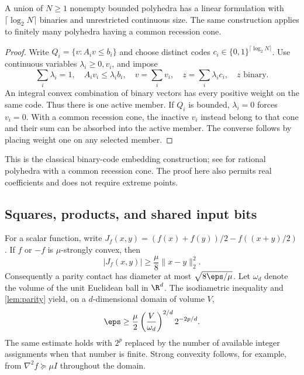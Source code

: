 \begin{lemma}\label{lem:disjunction}
A union of $N\ge1$ nonempty bounded polyhedra has a linear formulation
with $\lceil\log_2N\rceil$ binaries and unrestricted continuous size.
The same construction applies to finitely many polyhedra having a common
recession cone.
\end{lemma}
\begin{proof}
Write $Q_i=\{v:A_iv\le b_i\}$ and choose distinct codes
$c_i\in\{0,1\}^{\lceil\log_2N\rceil}$. Use continuous variables
$\lambda_i\ge0,v_i$, and impose
\[
 \sum_i\lambda_i=1,\quad A_iv_i\le\lambda_i b_i,\quad
 v=\sum_i v_i,\quad z=\sum_i\lambda_i c_i,\quad z\text{ binary}.
\]
An integral convex combination of binary vectors has every positive
weight on the same code. Thus there is one active member. If $Q_i$ is
bounded, $\lambda_i=0$ forces $v_i=0$. With a common recession cone,
the inactive $v_i$ instead belong to that cone and their sum can be
absorbed into the active member. The converse follows by placing weight
one on any selected member.
\end{proof}

This is the classical binary-code embedding construction; see
\citet[Proposition 1 and Corollary 1]{vielma2018} for rational polyhedra
with a common recession cone. The proof here also permits real
coefficients and does not require extreme points.

\subsection{Squares, products, and shared input bits}

For a scalar function, write
$J_f(x,y)=(f(x)+f(y))/2-f((x+y)/2)$. If $f$ or $-f$ is
$\mu$-strongly convex, then
\begin{equation}\label{eq:strong-midpoint}
 |J_f(x,y)|\ge\frac\mu8\|x-y\|_2^2.
\end{equation}
Consequently a parity contact has diameter at most
$\sqrt{8\eps/\mu}$. Let $\omega_d$ denote the volume of the unit
Euclidean ball in $\R^d$. The isodiametric inequality and
\cref{lem:parity} yield, on a $d$-dimensional domain of volume $V$,
\begin{equation}\label{eq:strong-lower}
 \eps\ge\frac\mu2\left(\frac{V}{\omega_d}\right)^{2/d}2^{-2p/d}.
\end{equation}
The same estimate holds with $2^p$ replaced by the number of available
integer assignments when that number is finite. Strong convexity follows,
for example, from $\nabla^2f\succeq\mu I$ throughout the domain.

